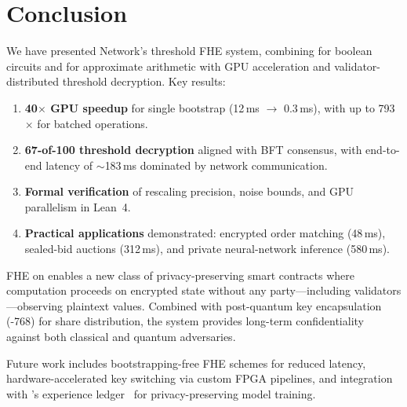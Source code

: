 \section{Conclusion}

\label{sec:conclusion}

We have presented \Zoo{} Network's threshold FHE system, combining \TFHE{} for boolean circuits and \CKKS{} for approximate arithmetic with GPU acceleration and validator-distributed threshold decryption. Key results:

\begin{enumerate}
  \item \textbf{40$\times$ GPU speedup} for single \TFHE{} bootstrap (12\,ms $\to$ 0.3\,ms), with up to 793$\times$ for batched operations.
  \item \textbf{67-of-100 threshold decryption} aligned with BFT consensus, with end-to-end latency of $\sim$183\,ms dominated by network communication.
  \item \textbf{Formal verification} of \CKKS{} rescaling precision, \TFHE{} noise bounds, and GPU parallelism in Lean~4.
  \item \textbf{Practical applications} demonstrated: encrypted order matching (48\,ms), sealed-bid auctions (312\,ms), and private neural-network inference (580\,ms).
\end{enumerate}

FHE on \Zoo{} \TChain{} enables a new class of privacy-preserving smart contracts where computation proceeds on encrypted state without any party---including validators---observing plaintext values. Combined with post-quantum key encapsulation (\MLKEM{}-768) for share distribution, the system provides long-term confidentiality against both classical and quantum adversaries.

Future work includes bootstrapping-free FHE schemes for reduced latency, hardware-accelerated key switching via custom FPGA pipelines, and integration with \Zoo{}'s experience ledger~\cite{zoo-tokenomics} for privacy-preserving model training.

